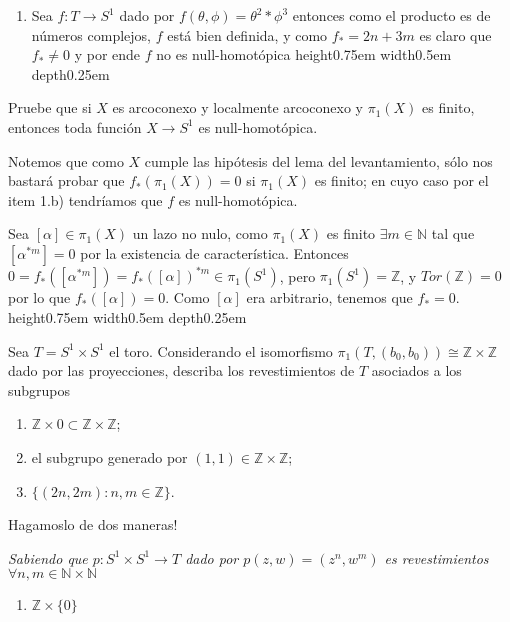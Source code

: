 \documentclass[11pt]{article}
\newcommand{\N}{{\mathbb{N}}}
\newcommand{\sett}[1]{\{#1\}}
\newenvironment{proof}[1][Demostraci\'on]{\begin{trivlist}
\item[\hskip \labelsep {\bfseries #1}]}{\end{trivlist}}
\newcommand{\qed}{\nobreak \ifvmode \relax \else
      \ifdim\lastskip<1.5em \hskip-\lastskip
      \hskip1.5em plus0em minus0.5em \fi \nobreak
      \vrule height0.75em width0.5em depth0.25em\fi}
\newcommand{\Z}{\mathbb{Z}}
\def \be{\begin{enumerate}}
\def \en{\end{enumerate}}
\begin{document}
\begin{enumerate}
\begin{proof}
\begin{enumerate}
\item Sea $f: T \rightarrow S^1$ dado por $f(\theta,\phi)=\theta ^2 * \phi ^3$ entonces como el producto es de n\'umeros complejos, $f$ est\'a bien definida, y como $f_* = 2n + 3m$ es claro que $f_* \neq 0$ y por ende $f$ no es null-homot\'opica \qed

\end{enumerate}

\end{proof}

\item {Pruebe que si	$X$ es arcoconexo y localmente arcoconexo y $\pi_1(X)$ es finito, entonces toda funci\'on $X\rightarrow S^1$ es null-homot\'opica.
}

\begin{proof}

Notemos que como $X$ cumple las hip\'otesis del lema del levantamiento, s\'olo nos bastar\'a probar que $f_*(\pi_1(X))=0$ si $\pi_1(X)$ es finito; en cuyo caso por el item 1.b) tendr\'iamos que $f$ es null-homot\'opica.

Sea $[\alpha] \in \pi_1(X)$ un lazo no nulo, como $\pi_1(X)$ es finito $\exists m \in \N$ tal que $[\alpha^{*m}]=0$ por la existencia de caracter\'istica. Entonces $0 = f_*([\alpha^{*m}]) = f_*([\alpha])^{*m} \in \pi_1(S^1)$, pero $\pi_1(S^1) = \Z$, y $Tor(\Z)=0$ por lo que $f_*([\alpha]) = 0$. Como $[\alpha]$ era arbitrario, tenemos que $f_* = 0$. \qed

\end{proof}

\item {Sea $T=S^1\times S^1$ el toro. Considerando el isomorfismo $\pi_1(T,(b_0,b_0))\cong\Z\times\Z$ dado por las proyecciones, describa los revestimientos de $T$ asociados a los subgrupos
\be	\item $\Z\times 0\subset \Z\times\Z$;
		\item el subgrupo generado por $(1,1)\in\Z\times\Z$;
		\item $\{(2n,2m): n,m\in\Z\}$.
		\en
}

\begin{proof}

Hagamoslo de dos maneras!

\textit{Sabiendo que $p:S^1 \times S^1 \rightarrow T$ dado por $p(z,w)= (z^n , w^m)$ es revestimientos $\forall n,m \in \N \times \N$}


\begin{enumerate}


\item {$\Z \times \sett{0}$}


\end{enumerate}
\end{proof}
\end{enumerate}
\end{document}
